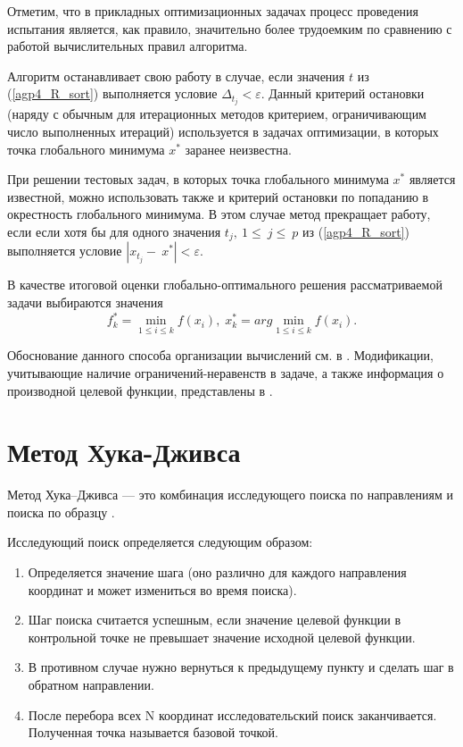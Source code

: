 \documentclass[12pt, a4paper, russian]{article}
\begin{document}
Отметим, что в прикладных оптимизационных задачах процесс проведения испытания является, как правило, значительно более трудоемким по сравнению с работой вычислительных правил алгоритма.

Алгоритм останавливает свою работу в случае, если значения $t$ из (\ref{agp4_R_sort}) выполняется условие \(\Delta_{t_j} < \varepsilon\). Данный критерий остановки (наряду с обычным для итерационных методов критерием, ограничивающим число выполненных итераций) используется в задачах оптимизации, в которых точка глобального минимума $x^*$ заранее неизвестна. 
	 
При решении тестовых задач, в которых точка глобального минимума $x^*$ является  известной, можно использовать также и критерий остановки по попаданию в окрестность глобального минимума. В этом случае метод прекращает работу, если если хотя бы для одного значения $t_j,\ 1\le\ j\le\ p$ из (\ref{agp4_R_sort}) выполняется условие $\left|x_{t_j}-\ x^\ast\right| < \varepsilon.$
	
В качестве итоговой оценки глобально-оптимального решения рассматриваемой задачи выбираются значения 
\begin{equation}
f_k^*=\min_{1\leq i \leq k}f(x_i), \; x_k^*=arg \min_{1\leq i \leq k}f(x_i).
\end{equation}



Обоснование данного способа организации вычислений см. в \cite{fio_bib20}. Модификации, учитывающие наличие ограничений-неравенств в задаче, а также информация о производной целевой функции, представлены в \cite{fio_bib12, fio_bib9, fio_bib11}.


\section{Метод Хука-Дживса}

Метод Хука–Дживса --- это комбинация исследующего поиска по направлениям и поиска по образцу \cite{fio_bib14, fio_bib15}.



Исследующий поиск определяется следующим образом: 
\begin{enumerate}
\item	Определяется значение шага (оно различно для каждого направления координат и может измениться во время поиска). 
\item	Шаг поиска считается успешным, если значение целевой функции в контрольной точке не превышает значение исходной целевой функции. 
\item	В противном случае нужно вернуться к предыдущему пункту и сделать шаг в обратном направлении. 
\item	После перебора всех N координат исследовательский поиск заканчивается. Полученная точка называется базовой точкой.
\end{enumerate}
\end{document}
